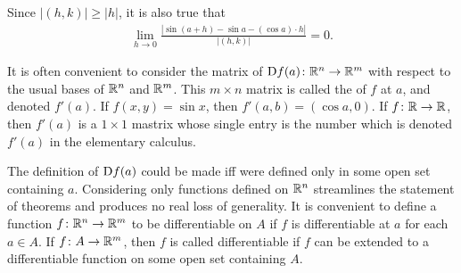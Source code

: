 Since $|(h, k)| \ge |h|$, it is also true that 
\begin{align*}
    \lim_{h\to 0}{\frac{|\sin(a+h) - \sin a - (\cos a)\cdot h|}{|(h, k)|}} = 0.
\end{align*}

It is often convenient to consider the matrix of $\mathrm{D}f(a)\colon \mathbb{R}^n\to \mathbb{R}^m$ 
with respect to the usual bases of $\mathbb{R}^n$ and $\mathbb{R}^m$. This $m\times n$ 
matrix is called the  of $f$ at $a$, and denoted $f'(a)$.
If $f(x, y) = \sin x$, then $f'(a, b) = (\cos a, 0)$. If $f\colon{}\mathbb{R}\to \mathbb{R}$, then 
$f'(a)$ is a $1\times 1$ mastrix whose single entry is the number which is denoted
$f'(a)$ in the elementary calculus.

The definition of $\mathrm{D}f(a)$ could be made iff were defined only
in some open set containing $a$. Considering only functions
defined on $\mathbb{R}^n$ streamlines the statement of theorems and
produces no real loss of generality. It is convenient to define
a function $f\colon{}\mathbb{R}^n\to \mathbb{R}^m$ to be differentiable on $A$ if $f$ 
is differentiable at $a$ for each $a\in A$. If $f\colon{}A \to \mathbb{R}^m$, 
then $f$ is called differentiable if $f$ can be extended to a 
differentiable function on some open set containing $A$.

